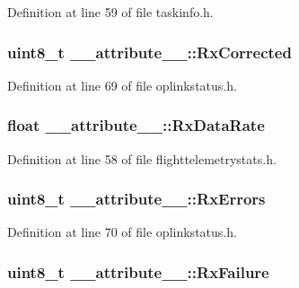 \-Definition at line 59 of file taskinfo.\-h.

\hypertarget{struct____attribute_____ad11b8311db937b577f6163b8e4e93d66}{
\subsubsection[{\-Rx\-Corrected}]{\setlength{\rightskip}{0pt plus 5cm}uint8\-\_\-t {\bf \-\_\-\-\_\-attribute\-\_\-\-\_\-\-::\-Rx\-Corrected}}}\label{struct____attribute_____ad11b8311db937b577f6163b8e4e93d66}


\-Definition at line 69 of file oplinkstatus.\-h.

\hypertarget{struct____attribute_____ae41fedc88e82e2d7358b9642b9c4e8f1}{
\subsubsection[{\-Rx\-Data\-Rate}]{\setlength{\rightskip}{0pt plus 5cm}float {\bf \-\_\-\-\_\-attribute\-\_\-\-\_\-\-::\-Rx\-Data\-Rate}}}\label{struct____attribute_____ae41fedc88e82e2d7358b9642b9c4e8f1}


\-Definition at line 58 of file flighttelemetrystats.\-h.

\hypertarget{struct____attribute_____a153065bff53d3d6f075f5d6959387a73}{
\subsubsection[{\-Rx\-Errors}]{\setlength{\rightskip}{0pt plus 5cm}uint8\-\_\-t {\bf \-\_\-\-\_\-attribute\-\_\-\-\_\-\-::\-Rx\-Errors}}}\label{struct____attribute_____a153065bff53d3d6f075f5d6959387a73}


\-Definition at line 70 of file oplinkstatus.\-h.

\hypertarget{struct____attribute_____a22457bdd88cc82d98e9892e2be6af702}{
\subsubsection[{\-Rx\-Failure}]{\setlength{\rightskip}{0pt plus 5cm}uint8\-\_\-t {\bf \-\_\-\-\_\-attribute\-\_\-\-\_\-\-::\-Rx\-Failure}}}\label{struct____attribute_____a22457bdd88cc82d98e9892e2be6af702}


